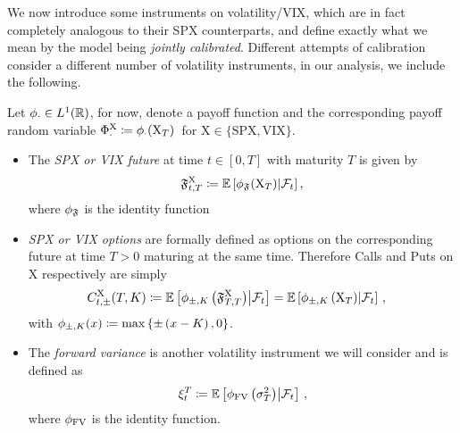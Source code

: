 We now introduce some instruments on volatility/VIX, which are in fact completely analogous to their SPX counterparts, and define exactly what we mean by the model being \textit{jointly calibrated}. Different attempts of calibration consider a different number of volatility instruments, in our analysis, we include the following. 

Let $\phi_\cdot\in L^1(\mathbb{R})$, for now, denote a payoff function and the corresponding payoff random variable $\Phi_{\cdot}^{\mathrm{X}}\coloneqq \phi_{\cdot}(\mathrm{X}_T)\,$ for $\mathrm{X}\in\{\text{SPX}, \text{VIX}\}$. 

\begin{itemize}
\item The \textit{SPX or VIX future} at time $t\in[0,T]$ with maturity $T$ is given by
\begin{equation*}
\mathfrak{F}_{t, T}^{\mathrm{X}}\coloneqq\mathbb{E}\left[\phi_{\mathfrak{F}}(\mathrm{X}_{T}) \middle\vert \mathcal{F}_{t}\right],
\end{equation*}
where $\phi_{\mathfrak{F}}$ is the identity function
\item \textit{SPX or VIX options} are formally defined as options on the corresponding future at time $T>0$ maturing at the same time. Therefore Calls and Puts on $\mathrm{X}$ respectively are simply
\begin{align*}
C_{t,\pm}^{\mathrm{X}}(T,K) &\coloneqq \mathbb{E}\left[\phi_{\pm, K}\left(\mathfrak{F}^{\mathrm{X}}_{T,T}\right) \middle\vert \mathcal{F}_{t}\right] = \mathbb{E}\left[\phi_{\pm, K}\left(\mathrm{X}_{T}\right)\middle\vert \mathcal{F}_{t}\right]\,,
\end{align*}
with $\phi_{\pm, K}(x) \coloneqq \max \left\{ \pm \left(x - K\right), 0 \right\}$.
\item The \textit{forward variance} is another volatility instrument we will consider and is defined as
\begin{equation*}
\xi_{t}^{T} \coloneqq\mathbb{E}\left[\phi_\textup{FV}\left(\sigma^2_T\right) \middle\vert \mathcal{F}_{t}\right]\,,
\end{equation*}
where $\phi_\textup{FV}$ is the identity function.
\end{itemize}

